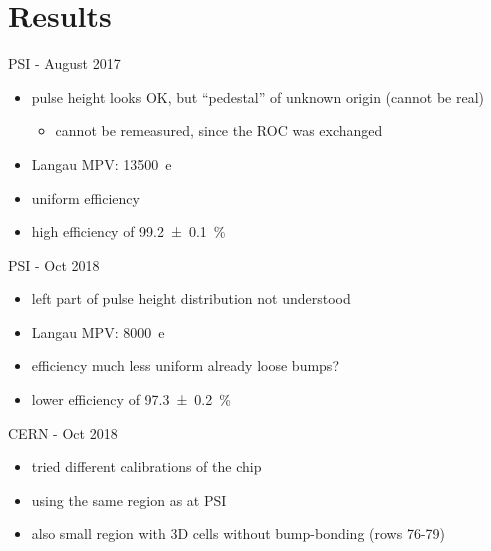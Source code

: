\section{Results}
\begin{frame}{PSI - August 2017}

	
	\begin{itemize}\itemfill
		\item<1-> pulse height looks OK, but ``pedestal'' of unknown origin (cannot be real)
		\begin{itemize}
			\item<1-> cannot be remeasured, since the ROC was exchanged 
		\end{itemize}
		\item<1-> Langau MPV: \SI{13500}{e}
		\item<1-> uniform efficiency
		\item<2> high efficiency of \SI{99.2\pm.1}{\%}
	\end{itemize}
	
\end{frame}
\begin{frame}{PSI - Oct 2018}

	
	\begin{itemize}\itemfill
		\item<1-> left part of pulse height distribution not understood
		\item<1-> Langau MPV: \SI{8000}{e}
		\item<1-> efficiency much less uniform \ra already loose bumps?
		\item<2> lower efficiency of \SI{97.3\pm.2}{\%}
	\end{itemize}
	
\end{frame}
\begin{frame}{CERN - Oct 2018}

	
	\begin{itemize}\itemfill
		\item tried different calibrations of the chip
		\item using the same region as at PSI 
		\item also small region with 3D cells without bump-bonding (rows 76-79)
	\end{itemize}
	
\end{frame}
